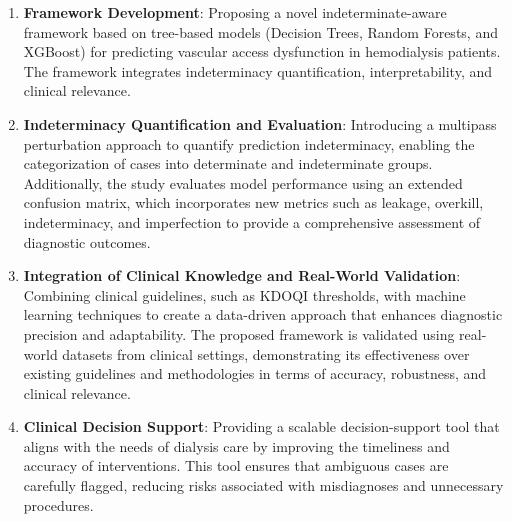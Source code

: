 \begin{enumerate}
  \item \textbf{Framework Development}: Proposing a novel indeterminate-aware framework based on tree-based models (Decision Trees, Random Forests, and XGBoost) for predicting vascular access dysfunction in hemodialysis patients. The framework integrates indeterminacy quantification, interpretability, and clinical relevance.
  \item \textbf{Indeterminacy Quantification and Evaluation}: Introducing a multipass perturbation approach to quantify prediction indeterminacy, enabling the categorization of cases into determinate and indeterminate groups. Additionally, the study evaluates model performance using an extended confusion matrix, which incorporates new metrics such as leakage, overkill, indeterminacy, and imperfection to provide a comprehensive assessment of diagnostic outcomes.
  \item \textbf{Integration of Clinical Knowledge and Real-World Validation}: Combining clinical guidelines, such as KDOQI thresholds, with machine learning techniques to create a data-driven approach that enhances diagnostic precision and adaptability. The proposed framework is validated using real-world datasets from clinical settings, demonstrating its effectiveness over existing guidelines and methodologies in terms of accuracy, robustness, and clinical relevance.
  \item \textbf{Clinical Decision Support}: Providing a scalable decision-support tool that aligns with the needs of dialysis care by improving the timeliness and accuracy of interventions. This tool ensures that ambiguous cases are carefully flagged, reducing risks associated with misdiagnoses and unnecessary procedures.
\end{enumerate}